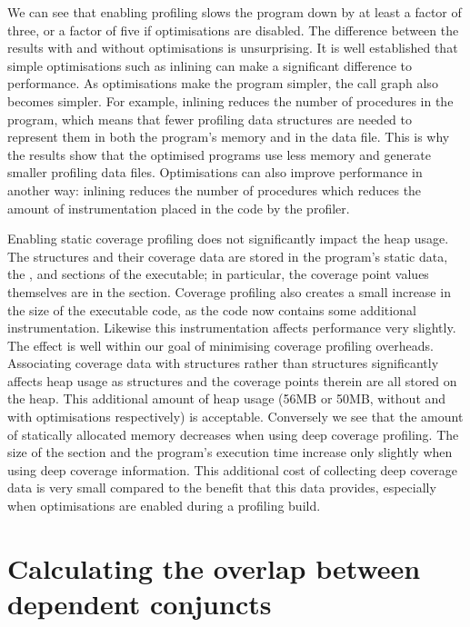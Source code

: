 We can see that enabling profiling slows the program down by at least a
factor of three,
or a factor of five if optimisations are disabled.
The difference between the results with and without optimisations is
unsurprising.
It is well established that simple optimisations such as inlining can make a
significant difference to performance.
As optimisations make the program simpler, the call graph also becomes
simpler.
For example, inlining reduces the number of procedures in the program,
which means that fewer profiling data structures are needed to represent
them in both the program's memory and in the data file.
This is why the results show that the optimised programs use less memory
and generate smaller profiling data files.
Optimisations can also improve performance in another way:
inlining reduces the number of procedures which reduces the amount of
instrumentation placed in the code by the profiler.

Enabling static coverage profiling does not significantly impact the heap
usage.
The \PS structures and their coverage data are stored in the program's
static data,
the ,  and  sections of the executable;
in particular, the coverage point values themselves are in the 
section.
Coverage profiling also creates a small increase in the size of the
executable code, as the code now contains some additional instrumentation.
Likewise this instrumentation affects performance very slightly.
The effect is well within our goal of minimising coverage profiling
overheads.
Associating coverage data with \PD structures rather than \PS structures
significantly affects heap usage as \PD structures and the coverage points
therein are all stored on the heap.
This additional amount of heap usage (56MB or 50MB,
without and with optimisations respectively)
is acceptable.
Conversely we see that the amount of statically allocated memory decreases
when using deep coverage profiling.
The size of the  section and the program's execution time
increase only slightly when using deep coverage information.
This additional cost of collecting deep coverage data is very small compared
to the benefit that this data provides,
especially when optimisations are enabled during a profiling build.


\section{Calculating the overlap between dependent conjuncts}
\label{sec:overlap_overlap_alg}

